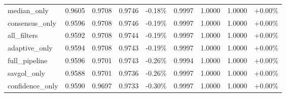 \begin{table}[htbp]
\begin{adjustbox}{max width=\textwidth}
\begin{tabular}{l cccc cccc}
median\_only & 0.9605 & 0.9708 & 0.9746 & -0.18\% & 0.9997 & 1.0000 & 1.0000 & +0.00\% \\
consensus\_only & 0.9596 & 0.9708 & 0.9746 & -0.19\% & 0.9997 & 1.0000 & 1.0000 & +0.00\% \\
all\_filters & 0.9592 & 0.9708 & 0.9744 & -0.19\% & 0.9997 & 1.0000 & 1.0000 & +0.00\% \\
adaptive\_only & 0.9594 & 0.9708 & 0.9743 & -0.19\% & 0.9997 & 1.0000 & 1.0000 & +0.00\% \\
full\_pipeline & 0.9596 & 0.9701 & 0.9743 & -0.26\% & 0.9994 & 1.0000 & 1.0000 & +0.00\% \\
savgol\_only & 0.9588 & 0.9701 & 0.9736 & -0.26\% & 0.9997 & 1.0000 & 1.0000 & +0.00\% \\
confidence\_only & 0.9590 & 0.9697 & 0.9733 & -0.30\% & 0.9997 & 1.0000 & 1.0000 & +0.00\% \\
\bottomrule
\end{tabular}
\end{adjustbox}
\end{table}
